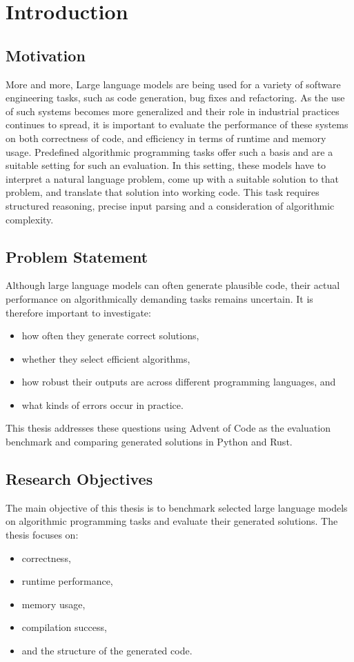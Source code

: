 \documentclass[12pt,a4paper]{report}
\begin{document}
\clearpage
{}

\chapter{Introduction}

\section{Motivation}
More and more, Large language models are being used for a variety of software engineering tasks, such as code generation, bug fixes and refactoring. As the use of such systems becomes more generalized and their role in industrial practices continues to spread, it is important to evaluate the performance of these systems on both correctness of code, and efficiency in terms of runtime and memory usage.
Predefined algorithmic programming tasks offer such a basis and are a suitable setting for such an evaluation. In this setting, these models have to interpret a natural language problem, come up with a suitable solution to that problem, and translate that solution into working code. This task requires structured reasoning, precise input parsing and a consideration of algorithmic complexity.


\section{Problem Statement}
Although large language models can often generate plausible code, their actual performance on algorithmically demanding tasks remains uncertain. It is therefore important to investigate:
\begin{itemize}
    \item how often they generate correct solutions,
    \item whether they select efficient algorithms,
    \item how robust their outputs are across different programming languages, and
    \item what kinds of errors occur in practice.
\end{itemize}

This thesis addresses these questions using Advent of Code as the evaluation benchmark and comparing generated solutions in Python and Rust.

\section{Research Objectives}
The main objective of this thesis is to benchmark selected large language models on algorithmic programming tasks and evaluate their generated solutions. The thesis focuses on:
\begin{itemize}
    \item correctness,
    \item runtime performance,
    \item memory usage,
    \item compilation success,
    \item and the structure of the generated code.
\end{itemize}
\end{document}
